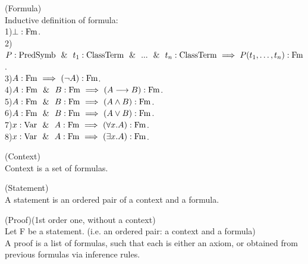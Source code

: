 \begin{definition}(Formula)\\
Inductive definition of formula:\\
1)$\bot:\mathrm{Fm}$.\\
2)$P:\mathrm{PredSymb}\ \ \&\ \  t_1:{\text{ClassTerm}} \ \ \&\ \  ...\ \ \&\ \  t_n:{\text{ClassTerm}}  \ \Longrightarrow\  P(t_1,\dots,t_n):\mathrm{Fm}$.\\
3)$A:\mathrm{Fm} \ \Longrightarrow\  (\neg A):\mathrm{Fm}$.\\
4)$A:\mathrm{Fm} \ \ \&\ \  B:\mathrm{Fm} \ \Longrightarrow\  (A\longrightarrow B):\mathrm{Fm}$.\\
5)$A:\mathrm{Fm} \ \ \&\ \  B:\mathrm{Fm} \ \Longrightarrow\  (A\land B):\mathrm{Fm}$.\\
6)$A:\mathrm{Fm} \ \ \&\ \  B:\mathrm{Fm} \ \Longrightarrow\  (A\lor B):\mathrm{Fm}$.\\
7)$x:\mathrm{Var} \ \ \&\ \  A:\mathrm{Fm} \ \Longrightarrow\  (\forall x.A):\mathrm{Fm}$.\\
8)$x:\mathrm{Var} \ \ \&\ \  A:\mathrm{Fm} \ \Longrightarrow\  (\exists x.A):\mathrm{Fm}$.\\
\end{definition}

\begin{definition}(Context)\\
Context is a set of formulas.
\end{definition}

\begin{definition}(Statement)\\
A statement is an ordered pair of a context and a formula.
\end{definition}

\begin{definition}(Proof)(1st order one, without a context)\\
Let F be a statement. (i.e. an ordered pair: a context and a formula)\\
A proof is a list of formulas, such that each is either an axiom, or obtained from previous formulas via inference rules.
\end{definition}


